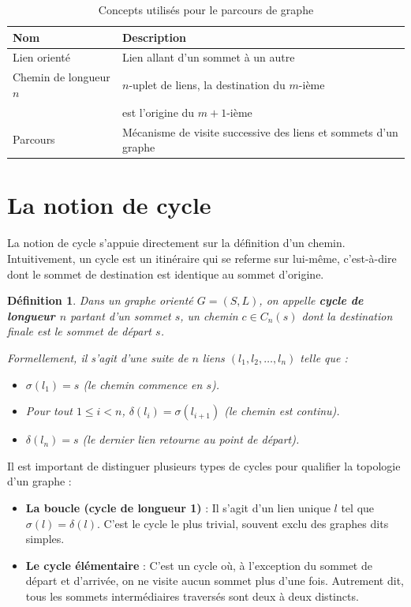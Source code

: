 \documentclass[11pt,a4paper]{report}
\newtheorem{definition}{Définition}
\begin{document}
	\begin{table}
		\centering
		\begin{tabular}{|l|l|}
			\hline 
			\textbf{Nom} & \textbf{Description} \\
			\hline 
			Lien orienté & Lien allant d'un sommet à un autre \\
			\hline 
			Chemin de longueur $n$ & $n$-uplet de liens, la destination du $m$-ième \\
			 & est l'origine du $m+1$-ième \\
			\hline 
			Parcours & Mécanisme de visite successive des liens et sommets d'un graphe \\
			\hline 
		\end{tabular}
		\caption{Concepts utilisés pour le parcours de graphe}
	\end{table}
	
	\section{La notion de cycle}
	
	La notion de cycle s'appuie directement sur la définition d'un chemin. Intuitivement, un cycle est un itinéraire qui se referme sur lui-même, c'est-à-dire dont le sommet de destination est identique au sommet d'origine.
	
	\begin{definition}
		Dans un graphe orienté $G = (S,L)$, on appelle \textbf{cycle de longueur $n$} partant d'un sommet $s$, un chemin $c \in C_n(s)$ dont la destination finale est le sommet de départ $s$. 
		
		Formellement, il s'agit d'une suite de $n$ liens $(l_1, l_2, \dots, l_n)$ telle que :
		\begin{itemize}
			\item $\sigma(l_1) = s$ (le chemin commence en $s$).
			\item Pour tout $1 \leq i < n$, $\delta(l_i) = \sigma(l_{i+1})$ (le chemin est continu).
			\item $\delta(l_n) = s$ (le dernier lien retourne au point de départ).
		\end{itemize}
	\end{definition}
	
	Il est important de distinguer plusieurs types de cycles pour qualifier la topologie d'un graphe :
	\begin{itemize}
		\item \textbf{La boucle (cycle de longueur 1)} : Il s'agit d'un lien unique $l$ tel que $\sigma(l) = \delta(l)$. C'est le cycle le plus trivial, souvent exclu des graphes dits \og{}simples\fg{}.
		\item \textbf{Le cycle élémentaire} : C'est un cycle où, à l'exception du sommet de départ et d'arrivée, on ne visite aucun sommet plus d'une fois. Autrement dit, tous les sommets intermédiaires traversés sont deux à deux distincts.
	\end{itemize}
	
\end{document}
